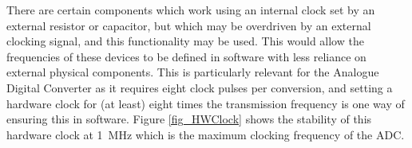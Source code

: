 \documentclass[../main.tex]{subfiles}
\begin{document}
There are certain components which work using an internal clock set by an external resistor or capacitor, but which may be overdriven by an external clocking signal, and this functionality may be used.
This would allow the frequencies of these devices to be defined in software with less reliance on external physical components.
This is particularly relevant for the Analogue Digital Converter as it requires eight clock pulses per conversion, and setting a hardware clock for (at least) eight times the transmission frequency is one way of ensuring this in software.
Figure \ref{fig_HWClock} shows the stability of this hardware clock at \SI{1}{\mega\hertz} which is the maximum clocking frequency of the ADC.\\
\end{document}
